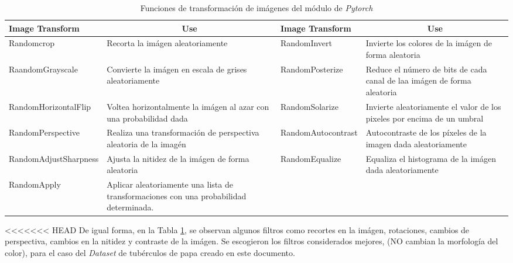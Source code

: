 			\begin{table}[ht]
				\centering
				\begin{tabular}{|p{4.5cm}|p{3.5cm}|p{3.8cm}|p{3.5cm}|}
					\hline
					Image Transform       & \multicolumn{1}{c|}{Use}                                                               & Image Transform       & \multicolumn{1}{c|}{Use}                                                \\ \hline
					Randomcrop            & Recorta la imágen aleatoriamente                                                       & RandomInvert          & Invierte los colores de la imágen de forma aleatoria                    \\ \hline
					RaandomGrayscale      & Convierte la imágen en escala de grises aleatoriamente                                 & RandomPosterize       & Reduce el número de bits de cada canal de laa imágen de forma aleatoria \\ \hline
					RandomHorizontalFlip  & Voltea horizontalmente la imágen al azar con una probabilidad dada                     & RandomSolarize        & Invierte aleatoriamente el valor de los pixeles por encima de un umbral \\ \hline
					RandomPerspective     & Realiza una transformación de perspectiva aleatoria de la imagén                       & RandomAutocontrast    & Autocontraste de los píxeles de la imagen dada aleatoriamente           \\ \hline
					RandomAdjustSharpness & Ajusta la nitidez de la imágen de forma aleatoria                                      & RandomEqualize        & Equaliza el histograma de la imágen dada aleatoriamente                 \\ \hline
					RandomApply           & Aplicar aleatoriamente una lista de transformaciones con una probabilidad determinada. & \multicolumn{1}{l|}{} &                                                                         \\ \hline
				\end{tabular}				
				\caption{Funciones de transformación de imágenes del módulo de \textit{Pytorch}}
				\label{table:filters2}
			\end{table}
<<<<<<< HEAD
\newpage
			De igual forma, en la Tabla \ref{table:filters2}, se observan algunos filtros como recortes en la imágen, rotaciones, cambios de perspectiva, cambios en la nitidez y contraste de la imágen. Se escogieron los filtros considerados mejores, (NO cambian la morfología del color), para el caso del \textit{Dataset} de tubérculos de papa creado en este documento. 
			
